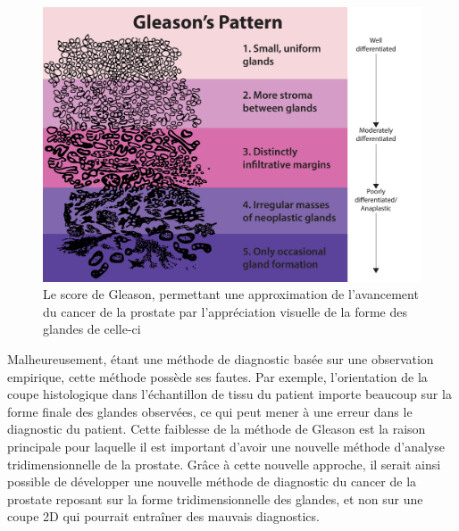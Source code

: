 \documentclass[utf8]{stageM2R}
\begin{document}
{{			\begin{figure}[!htp]
				\centering
				\includegraphics[width=0.5\linewidth]{./img/gleason_score.jpg}
				\caption{Le score de Gleason, permettant une approximation de l'avancement du cancer de la prostate par l'appréciation visuelle de la forme des glandes de celle-ci}
				\label{gleason_score}
			\end{figure}

			Malheureusement, étant une méthode de diagnostic basée sur une observation empirique, cette méthode possède ses fautes. Par exemple, l'orientation de la coupe histologique dans l'échantillon de tissu du patient importe beaucoup sur la forme finale des glandes observées, ce qui peut mener à une erreur dans le diagnostic du patient. Cette faiblesse de la méthode de Gleason est la raison principale pour laquelle il est important d'avoir une nouvelle méthode d'analyse tridimensionnelle de la prostate. Grâce à cette nouvelle approche, il serait ainsi possible de développer une nouvelle méthode de diagnostic du cancer de la prostate reposant sur la forme tridimensionnelle des glandes, et non sur une coupe 2D qui pourrait entraîner des mauvais diagnostics.\\
		}

	}
\end{document}
